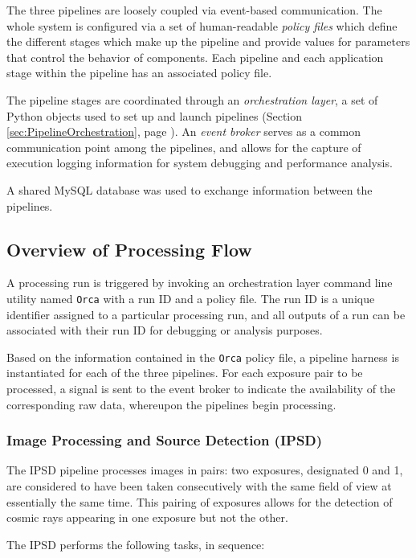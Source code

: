 The three pipelines are loosely coupled via event-based communication. 
The whole system is configured via a set of 
human-readable \textit{policy files} which define the different stages which make 
up the pipeline and provide values for parameters that control the behavior of components.
Each pipeline and each application stage within the pipeline has an associated
policy file. 

The pipeline stages are coordinated through an \textit{orchestration layer},
a set of Python objects used to set up and launch pipelines (Section 
\ref{sec:PipelineOrchestration}, page \pageref{sec:PipelineOrchestration}).
An \textit{event broker} serves as a common communication
point among the pipelines, and allows for the capture of execution
logging information for system debugging and performance analysis. 

A shared MySQL database was used to exchange information between the
pipelines.

\subsection{Overview of Processing Flow}

A processing run is triggered by invoking an orchestration layer 
command line utility named \texttt{Orca} with a run ID and a policy file.
The run ID is a unique identifier assigned to a particular processing run,
and all outputs of a run can be associated with their run ID for debugging
or analysis purposes.

Based on the information contained in the \texttt{Orca} policy file, a
pipeline harness is instantiated for each of the three pipelines. For each
exposure pair to be processed, a signal is sent to the event broker to indicate
the availability of the corresponding raw data, whereupon the pipelines 
begin processing.

\subsubsection{Image Processing and Source Detection (IPSD)}

The IPSD pipeline processes images in pairs: two exposures, designated 0 and 1, 
are considered to have been taken consecutively with the same field of view at 
essentially the same time. This pairing of exposures allows for the detection 
of cosmic rays appearing in one exposure but not the other. 

The IPSD performs the following tasks, in sequence:

